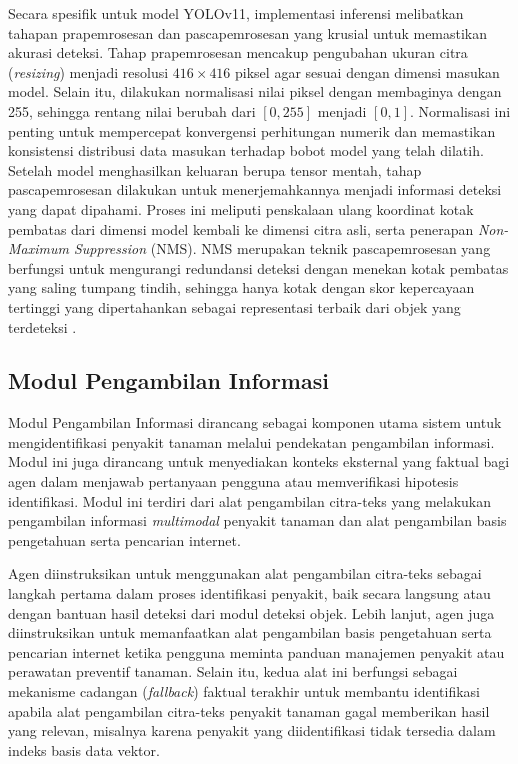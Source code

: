 Secara spesifik untuk model YOLOv11, implementasi inferensi melibatkan tahapan prapemrosesan dan pascapemrosesan yang krusial untuk memastikan akurasi deteksi. Tahap prapemrosesan mencakup pengubahan ukuran citra (\textit{resizing}) menjadi resolusi $416 \times 416$ piksel agar sesuai dengan dimensi masukan model. Selain itu, dilakukan normalisasi nilai piksel dengan membaginya dengan 255, sehingga rentang nilai berubah dari $[0, 255]$ menjadi $[0, 1]$. Normalisasi ini penting untuk mempercepat konvergensi perhitungan numerik dan memastikan konsistensi distribusi data masukan terhadap bobot model yang telah dilatih. Setelah model menghasilkan keluaran berupa tensor mentah, tahap pascapemrosesan dilakukan untuk menerjemahkannya menjadi informasi deteksi yang dapat dipahami. Proses ini meliputi penskalaan ulang koordinat kotak pembatas dari dimensi model kembali ke dimensi citra asli, serta penerapan \textit{Non-Maximum Suppression} (NMS). NMS merupakan teknik pascapemrosesan yang berfungsi untuk mengurangi redundansi deteksi dengan menekan kotak pembatas yang saling tumpang tindih, sehingga hanya kotak dengan skor kepercayaan tertinggi yang dipertahankan sebagai representasi terbaik dari objek yang terdeteksi \parencite{redmonYouOnlyLook2016a}.

\subsection{Modul Pengambilan Informasi}
Modul Pengambilan Informasi dirancang sebagai komponen utama sistem untuk mengidentifikasi penyakit tanaman melalui pendekatan pengambilan informasi. Modul ini juga dirancang untuk menyediakan konteks eksternal yang faktual bagi agen dalam menjawab pertanyaan pengguna atau memverifikasi hipotesis identifikasi. Modul ini terdiri dari alat pengambilan citra-teks yang melakukan pengambilan informasi \textit{multimodal} penyakit tanaman dan alat pengambilan basis pengetahuan serta pencarian internet. 

Agen diinstruksikan untuk menggunakan alat pengambilan citra-teks sebagai langkah pertama dalam proses identifikasi penyakit, baik secara langsung atau dengan bantuan hasil deteksi dari modul deteksi objek. Lebih lanjut, agen juga diinstruksikan untuk memanfaatkan alat pengambilan basis pengetahuan serta pencarian internet ketika pengguna meminta panduan manajemen penyakit atau perawatan preventif tanaman. Selain itu, kedua alat ini berfungsi sebagai mekanisme cadangan (\textit{fallback}) faktual terakhir untuk membantu identifikasi apabila alat pengambilan citra-teks penyakit tanaman gagal memberikan hasil yang relevan, misalnya karena penyakit yang diidentifikasi tidak tersedia dalam indeks basis data vektor. 

